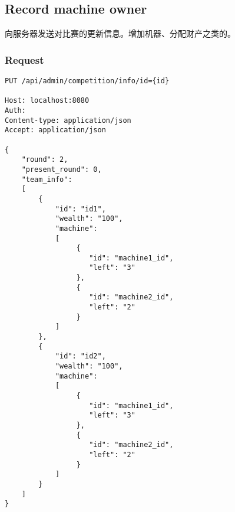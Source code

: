 \documentclass{article}
\begin{document}
\subsection{Record machine owner}
向服务器发送对比赛的更新信息。增加机器、分配财产之类的。

\subsubsection*{Request}
\begin{lstlisting}
PUT /api/admin/competition/info/id={id}

Host: localhost:8080
Auth:
Content-type: application/json
Accept: application/json

{
    "round": 2,
    "present_round": 0,
    "team_info":
    [
        {
            "id": "id1",
            "wealth": "100",
            "machine":
            [
                 {
                    "id": "machine1_id",
                    "left": "3"
                 },
                 {
                    "id": "machine2_id",
                    "left": "2"
                 }
            ]
        },
        {
            "id": "id2",
            "wealth": "100",
            "machine":
            [
                 {
                    "id": "machine1_id",
                    "left": "3"
                 },
                 {
                    "id": "machine2_id",
                    "left": "2"
                 }
            ]
        }
    ]
}
\end{lstlisting}
\end{document}
